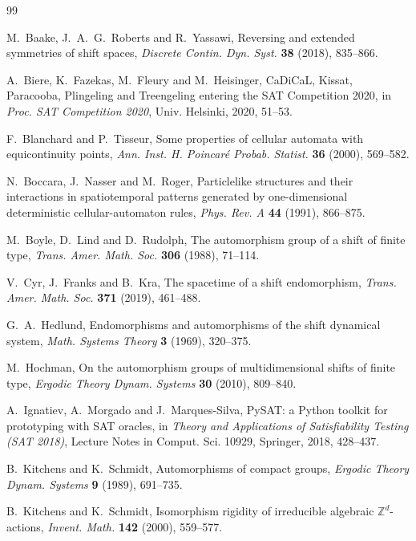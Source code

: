 \begin{thebibliography}{99}

 M.~Baake, J.~A.~G.~Roberts and R.~Yassawi, Reversing and extended symmetries of shift spaces, \emph{Discrete Contin. Dyn. Syst.} \textbf{38} (2018), 835--866.

 A.~Biere, K.~Fazekas, M.~Fleury and M.~Heisinger, CaDiCaL, Kissat, Paracooba, Plingeling and Treengeling entering the SAT Competition 2020, in \emph{Proc. SAT Competition 2020}, Univ. Helsinki, 2020, 51--53.

 F.~Blanchard and P.~Tisseur, Some properties of cellular automata with equicontinuity points, \emph{Ann. Inst. H. Poincar\'e Probab. Statist.} \textbf{36} (2000), 569--582.

 N.~Boccara, J.~Nasser and M.~Roger, Particlelike structures and their interactions in spatiotemporal patterns generated by one-dimensional deterministic cellular-automaton rules, \emph{Phys. Rev. A} \textbf{44} (1991), 866--875.

 M.~Boyle, D.~Lind and D.~Rudolph, The automorphism group of a shift of finite type, \emph{Trans. Amer. Math. Soc.} \textbf{306} (1988), 71--114.

 V.~Cyr, J.~Franks and B.~Kra, The spacetime of a shift endomorphism, \emph{Trans. Amer. Math. Soc.} \textbf{371} (2019), 461--488.

 G.~A.~Hedlund, Endomorphisms and automorphisms of the shift dynamical system, \emph{Math. Systems Theory} \textbf{3} (1969), 320--375.

 M.~Hochman, On the automorphism groups of multidimensional shifts of finite type, \emph{Ergodic Theory Dynam. Systems} \textbf{30} (2010), 809--840.

 A.~Ignatiev, A.~Morgado and J.~Marques-Silva, PySAT: a Python toolkit for prototyping with SAT oracles, in \emph{Theory and Applications of Satisfiability Testing (SAT 2018)}, Lecture Notes in Comput. Sci. 10929, Springer, 2018, 428--437.

 B.~Kitchens and K.~Schmidt, Automorphisms of compact groups, \emph{Ergodic Theory Dynam. Systems} \textbf{9} (1989), 691--735.

 B.~Kitchens and K.~Schmidt, Isomorphism rigidity of irreducible algebraic $\mathbb{Z}^d$-actions, \emph{Invent. Math.} \textbf{142} (2000), 559--577.


\end{thebibliography}
